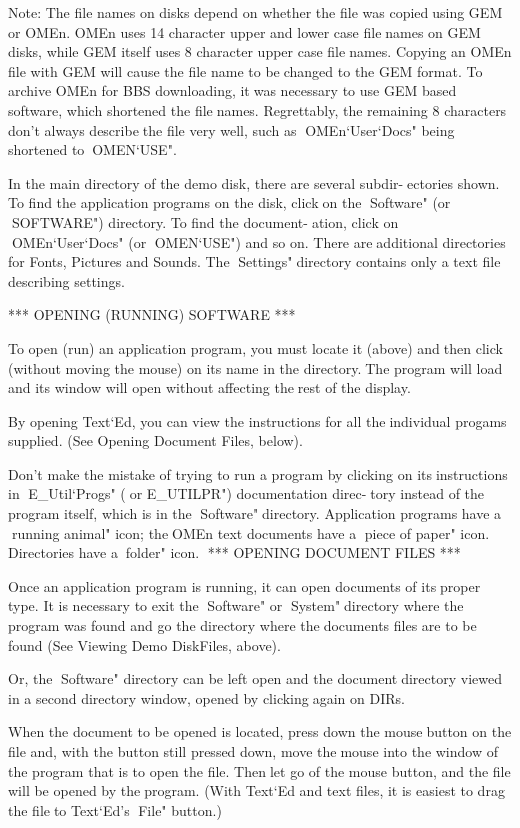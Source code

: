 Note: The file names on disks depend on whether the file was copiedusing GEM or OMEn. OMEn uses 14 character upper and lower case filenames on GEM disks, while GEM itself uses 8 character upper case filenames. Copying an OMEn file with GEM will cause the file name to bechanged to the GEM format. To archive OMEn for BBS downloading, itwas necessary to use GEM based software, which shortened the filenames. Regrettably, the remaining 8 characters don't always describethe file very well, such as OMEn`User`Docs" being shortened toOMEN`USE".

In the main directory of the demo disk, there are several subdir-ectories shown. To find the application programs on the disk, clickon the Software" (or SOFTWARE") directory. To find the document-ation, click on OMEn`User`Docs" (or OMEN`USE") and so on. There areadditional directories for Fonts, Pictures and Sounds. The Settings"directory contains only a text file describing settings.


*** OPENING (RUNNING) SOFTWARE ***

To open (run) an application program, you must locate it (above) andthen click (without moving the mouse) on its name in the directory.The program will load and its window will open without affecting therest of the display.

By opening Text`Ed, you can view the instructions for all theindividual progams supplied. (See Opening Document Files, below).

Don't make the mistake of trying to run a program by clicking on itsinstructions in E_Util`Progs" (or E_UTILPR") documentation direc-tory instead of the program itself, which is in the Software"directory. Application programs have a running animal" icon; theOMEn text documents have a piece of paper" icon. Directories have afolder" icon.
*** OPENING DOCUMENT FILES ***

Once an application program is running, it can open documents of itsproper type. It is necessary to exit the Software" or System"directory where the program was found and go the directory where thedocuments files are to be found (See Viewing Demo DiskFiles, above).

Or, the Software" directory can be left open and the documentdirectory viewed in a second directory window, opened by clickingagain on DIRs.

When the document to be opened is located, press down the mousebutton on the file and, with the button still pressed down, move themouse into the window of the program that is to open the file. Thenlet go of the mouse button, and the file will be opened by theprogram. (With Text`Ed and text files, it is easiest to drag the fileto Text`Ed's File" button.)

